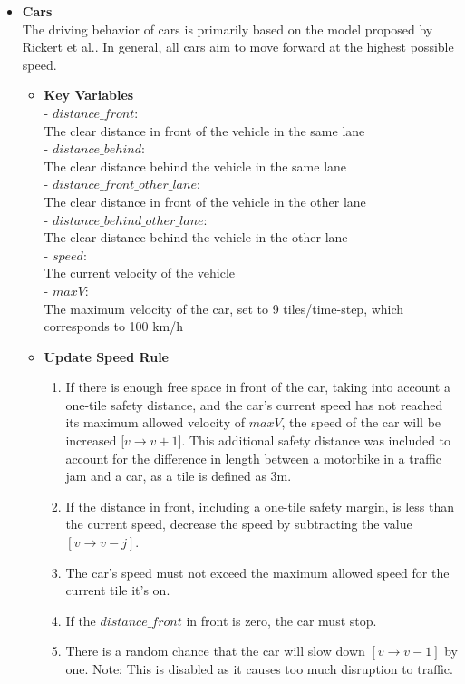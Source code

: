  \begin{itemize}
     \item \textbf{Cars} \\
     The driving behavior of cars is primarily based on the model proposed by Rickert et al.\cite{RICKERT1996534}. In general, all cars aim to move forward at the highest possible speed.
     \begin{itemize}
         \item \textbf{Key Variables} \\
         - $distance\_front$: \\ 
         The clear distance in front of the vehicle in the same lane\\
         - $distance\_behind$: \\ 
         The clear distance behind the vehicle in the same lane\\
         - $distance\_front\_other\_lane$: \\
         The clear distance in front of the vehicle in the other lane\\
         - $distance\_behind\_other\_lane$: \\
         The clear distance behind the vehicle in the other lane\\
         - $speed$: \\
         The current velocity of the vehicle\\
         - $maxV$: \\
         The maximum velocity of the car, set to 9 tiles/time-step, which corresponds to 100 km/h\\
         
         \item \textbf{Update Speed Rule}
         \begin{enumerate}
             \item If there is enough free space in front of the car, taking into account a one-tile safety distance, and the car's current speed has not reached its maximum allowed velocity of $maxV$, the speed of the car will be increased [$v \rightarrow v + 1$]. This additional safety distance was included to account for the difference in length between a motorbike in a traffic jam and a car, as a tile is defined as 3m.
             \item If the distance in front, including a one-tile safety margin, is less than the current speed, decrease the speed by subtracting the value $[v \rightarrow v-j]$.
             \item The car's speed must not exceed the maximum allowed speed for the current tile it's on.
             \item If the $distance\_front$ in front is zero, the car must stop.
             \item There is a random chance that the car will slow down $[v \rightarrow v-1]$ by one. Note: This is disabled as it causes too much disruption to traffic.\\
         \end{enumerate}
         

\end{itemize}
\end{itemize}
